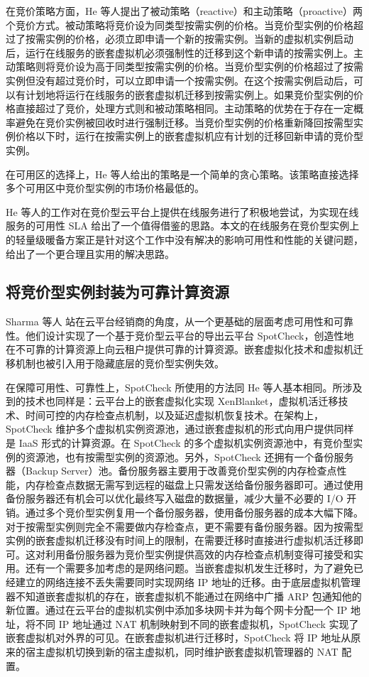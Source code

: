 在竞价策略方面，He 等人提出了被动策略（reactive）和主动策略（proactive）两个竞价方式。被动策略将竞价设为同类型按需实例的价格。当竞价型实例的价格超过了按需实例的价格，必须立即申请一个新的按需实例。当新的虚拟机实例启动后，运行在线服务的嵌套虚拟机必须强制性的迁移到这个新申请的按需实例上。主动策略则将竞价设为高于同类型按需实例的价格。当竞价型实例的价格超过了按需实例但没有超过竞价时，可以立即申请一个按需实例。在这个按需实例启动后，可以有计划地将运行在线服务的嵌套虚拟机迁移到按需实例上。如果竞价型实例的价格直接超过了竞价，处理方式则和被动策略相同。主动策略的优势在于存在一定概率避免在竞价实例被回收时进行强制迁移。当竞价型实例的价格重新降回按需型实例价格以下时，运行在按需实例上的嵌套虚拟机应有计划的迁移回新申请的竞价型实例。

在可用区的选择上，He 等人给出的策略是一个简单的贪心策略。该策略直接选择多个可用区中竞价型实例的市场价格最低的。

He 等人的工作对在竞价型云平台上提供在线服务进行了积极地尝试，为实现在线服务的可用性 SLA 给出了一个值得借鉴的思路。本文的在线服务在竞价型实例上的轻量级暖备方案正是针对这个工作中没有解决的影响可用性和性能的关键问题，给出了一个更合理且实用的解决思路。

\subsection{将竞价型实例封装为可靠计算资源}
Sharma 等人 \cite{Sharma:2015:SDD:2741948.2741953} 站在云平台经销商的角度，从一个更基础的层面考虑可用性和可靠性。他们设计实现了一个基于竞价型云平台的导出云平台 SpotCheck，创造性地在不可靠的计算资源上向云租户提供可靠的计算资源。嵌套虚拟化技术和虚拟机迁移机制也被引入用于隐藏底层的竞价型实例失效。

在保障可用性、可靠性上，SpotCheck 所使用的方法同 He 等人基本相同。所涉及到的技术也同样是：云平台上的嵌套虚拟化实现 XenBlanket，虚拟机活迁移技术、时间可控的内存检查点机制，以及延迟虚拟机恢复技术。在架构上，SpotCheck 维护多个虚拟机实例资源池，通过嵌套虚拟机的形式向用户提供同样是 IaaS 形式的计算资源。在 SpotCheck 的多个虚拟机实例资源池中，有竞价型实例的资源池，也有按需型实例的资源池。另外，SpotCheck 还拥有一个备份服务器（Backup Server）池。备份服务器主要用于改善竞价型实例的内存检查点性能，内存检查点数据无需写到远程的磁盘上只需发送给备份服务器即可。通过使用备份服务器还有机会可以优化最终写入磁盘的数据量，减少大量不必要的 I/O 开销。通过多个竞价型实例复用一个备份服务器，使用备份服务器的成本大幅下降。对于按需型实例则完全不需要做内存检查点，更不需要有备份服务器。因为按需型实例的嵌套虚拟机迁移没有时间上的限制，在需要迁移时直接进行虚拟机活迁移即可。这对利用备份服务器为竞价型实例提供高效的内存检查点机制变得可接受和实用。还有一个需要多加考虑的是网络问题。当嵌套虚拟机发生迁移时，为了避免已经建立的网络连接不丢失需要同时实现网络 IP 地址的迁移。由于底层虚拟机管理器不知道嵌套虚拟机的存在，嵌套虚拟机不能通过在网络中广播 ARP 包通知他的新位置。通过在云平台的虚拟机实例中添加多块网卡并为每个网卡分配一个 IP 地址，将不同 IP 地址通过 NAT 机制映射到不同的嵌套虚拟机，SpotCheck 实现了嵌套虚拟机对外界的可见。在嵌套虚拟机进行迁移时，SpotCheck 将 IP 地址从原来的宿主虚拟机切换到新的宿主虚拟机，同时维护嵌套虚拟机管理器的 NAT 配置。

